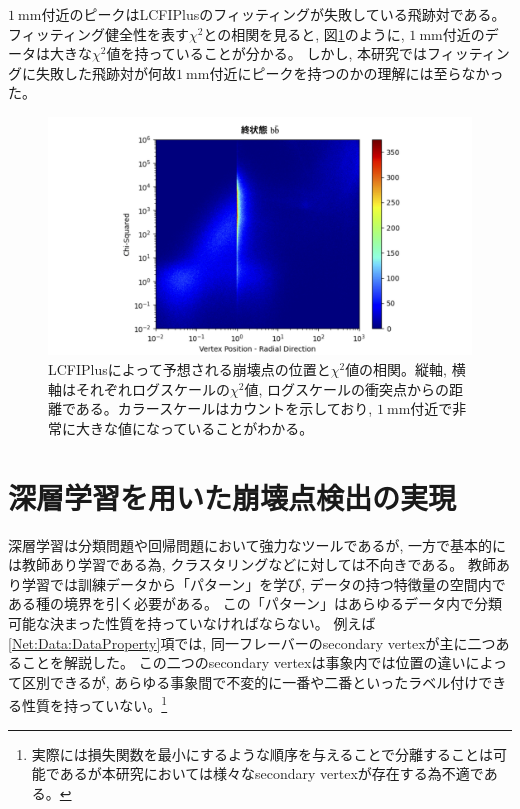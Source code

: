 $1\ \mathrm{mm}$付近のピークはLCFIPlusのフィッティングが失敗している飛跡対である。
フィッティング健全性を表す$\chi^2$との相関を見ると, 図\ref{3-1-2-4VertexPositionsvsChiSquare}のように, $1\ \mathrm{mm}$付近のデータは大きな$\chi^2$値を持っていることが分かる。
しかし, 本研究ではフィッティングに失敗した飛跡対が何故$1\ \mathrm{mm}$付近にピークを持つのかの理解には至らなかった。

\begin{figure}[htbp]
 \centering
 \includegraphics[width=1.0\textwidth, clip]{Figure/3Networks/3-1-2-4VertexPositionsvsChiSquare.png}
 \caption[LCFIPlusによって予想される崩壊点の位置と$\chi^2$値の相関]{LCFIPlusによって予想される崩壊点の位置と$\chi^2$値の相関。縦軸, 横軸はそれぞれログスケールの$\chi^2$値, ログスケールの衝突点からの距離である。カラースケールはカウントを示しており, $1\ \mathrm{mm}$付近で非常に大きな値になっていることがわかる。}
 \label{3-1-2-4VertexPositionsvsChiSquare}
\end{figure}

\newpage
\section{深層学習を用いた崩壊点検出の実現} \label{Net:forVertexFinderwithDL}

深層学習は分類問題や回帰問題において強力なツールであるが, 一方で基本的には教師あり学習である為, クラスタリングなどに対しては不向きである。
教師あり学習では訓練データから「パターン」を学び, データの持つ特徴量の空間内である種の境界を引く必要がある。
この「パターン」はあらゆるデータ内で分類可能な決まった性質を持っていなければならない。
例えば\ref{Net:Data:DataProperty}項では, 同一フレーバーのsecondary vertexが主に二つあることを解説した。
この二つのsecondary vertexは事象内では位置の違いによって区別できるが, あらゆる事象間で不変的に一番や二番といったラベル付けできる性質を持っていない。\footnote{実際には損失関数を最小にするような順序を与えることで分離することは可能であるが本研究においては様々なsecondary vertexが存在する為不適である。}

